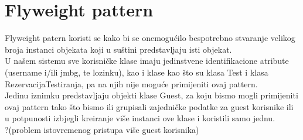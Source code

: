 \documentclass{article}
\begin{document}
\section*{Flyweight pattern}
\vspace{1mm}
Flyweight patern koristi se kako bi se onemogućilo bespotrebno stvaranje velikog broja instanci objekata koji u suštini predstavljaju isti objekat.\\
U našem sistemu sve korisničke klase imaju jedinstvene identifikacione atribute (username i/ili jmbg, te lozinku), kao i klase kao što su klasa Test i klasa RezervacijaTestiranja, pa na njih nije moguće primijeniti ovaj pattern.\\
Jedinu iznimku predstavljaju objekti klase Guest, za koju bismo mogli primijeniti ovaj pattern tako što bismo ili grupisali zajedničke podatke za guest korisnike ili u potpunosti izbjegli kreiranje više instanci ove klase i koristili samo jednu.\\ ?(problem istovremenog pristupa više guest korisnika)\\
\end{document}
